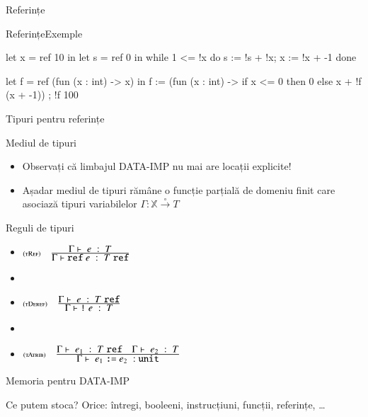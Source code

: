 \documentclass[xcolor=pdftex,romanian,colorlinks]{beamer}
\begin{document}
\begin{section}{Referințe}
\begin{frame}[fragile]{Referințe}{Exemple}
\begin{minipage}{.35\columnwidth}
\begin{asciiml}
let x = ref 10 in
let s = ref 0 in
  while 1 <= !x do
    s := !s + !x;
    x := !x + -1
  done
\end{asciiml}
\end{minipage}
\hfill
\begin{minipage}{.60\columnwidth}
\begin{asciiml}
let f = ref (fun (x : int) -> x) in
f := (fun (x : int) -> if x <= 0 
                       then 0 
                       else x + !f (x + -1)) ;
!f 100
\end{asciiml}
\end{minipage}
\end{frame}


\begin{frame}{Tipuri pentru referințe}
\begin{block}{Mediul de tipuri}
\begin{itemize}
\item Observați că limbajul DATA-IMP nu mai are locații explicite!
\item Așadar mediul de tipuri rămâne o funcție parțială de domeniu finit care asociază tipuri variabilelor $\Gamma : \mathbb{X} \stackrel\circ\rightarrow T$
\end{itemize}
\end{block}

\begin{block}{Reguli de tipuri}
\begin{itemize}
\item[] 
$\reg[tRef]{\tjud{\Sref e}{T \Sref}}{\tjud{e}{T}{}}{}$
\item[]
\item[] $\reg[tDeref]{\tjud{\terminal{!} e}{T}}{\tjud{e}{T \Sref}{}}{}$
\item[]
\item[]
$\reg[tAtrib]{\tjud{e_1 \terminal{:=} e_2}{\Sunit}}{\tjud{e_1}{T \Sref}{}\si \tjud{e_2}{T}{}}{}$

\end{itemize}
\end{block}
\end{frame}

\begin{frame}{Memoria pentru DATA-IMP}
\begin{block}{Ce putem stoca?}
Orice: întregi, booleeni, instrucțiuni, funcții, referințe, \ldots 
\end{block}


\end{frame}
\end{section}
\end{document}
